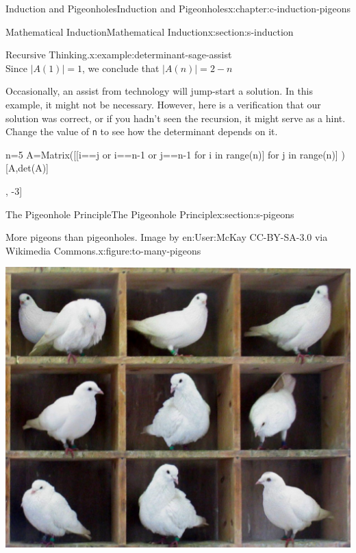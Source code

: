 \documentclass[twoside,10pt,]{book}
\newcommand{\mono}[1]{\texttt{#1}}
\numberwithin{equation}{section}
\begin{document}
\begin{chapterptx}{Induction and Pigeonholes}{}{Induction and Pigeonholes}{}{}{x:chapter:c-induction-pigeons}
\begin{sectionptx}{Mathematical Induction}{}{Mathematical Induction}{}{}{x:section:s-induction}
\begin{example}{Recursive Thinking.}{x:example:determinant-sage-assist}
\begin{equation*}
\end{equation*}
Since \(\lvert A(1) \rvert = 1\), we conclude that \(\lvert A(n) \rvert = 2-n \)%
\par
Occasionally, an assist from technology will jump-start a solution.  In this example, it might not be necessary. However, here is a verification that our solution was correct, or if you hadn't seen the recursion, it might serve as a hint.   Change the value of \mono{n} to see how the determinant depends on it.%
\begin{sageinput}
n=5
A=Matrix([[i==j or i==n-1 or j==n-1 for i in range(n)] for j in range(n)] )
[A,det(A)]
\end{sageinput}
\begin{sageoutput}
[[1 0 0 0 1]
[0 1 0 0 1]
[0 0 1 0 1]
[0 0 0 1 1]
[1 1 1 1 1], -3]
\end{sageoutput}
\end{example}
\end{sectionptx}
%
%
\typeout{************************************************}
\typeout{************************************************}
%
\begin{sectionptx}{The Pigeonhole Principle}{}{The Pigeonhole Principle}{}{}{x:section:s-pigeons}
%
\begin{figureptx}{More pigeons than pigeonholes.  Image by en:User:McKay CC-BY-SA-3.0 via Wikimedia Commons.}{x:figure:to-many-pigeons}{}%
\begin{image}{0}{1}{0}%
\includegraphics[width=\linewidth]{images/TooManyPigeons.jpg}

\end{image}
\end{figureptx}
\end{sectionptx}
\end{chapterptx}
\end{document}

